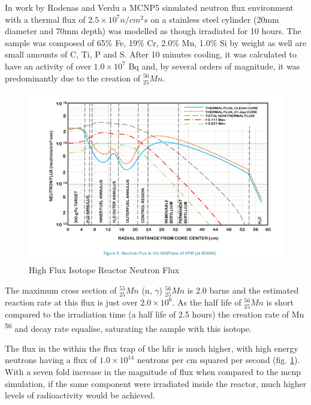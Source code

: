 In work by Rodenas and Verdu a MCNP5 simulated neutron flux environment with a thermal flux of $2.5 \times 10^7 n/cm^2 s$ on a stainless steel cylinder (20mm diameter and 70mm depth) was modelled as though irradiated for 10 hours\cite{radionuclides}.  The sample was composed of 65\% Fe, 19\% Cr, 2.0\% Mn, 1.0\% Si by weight as well are small amounts of C, Ti, P and S.  After 10 minutes cooling, it was calculated to have an activity of over $1.0 \times 10^7$ Bq and, by several orders of magnitude, it was predominantly due to the creation of ${}^{56}_{25}Mn$.  

\begin{figure}
  \begin{center}
    \includegraphics[width=0.75\linewidth]{chapters/consequences_of_ionizing_radiation/images/HFIR_neutron_spectra_guide.png}
    \caption{High Flux Isotope Reactor Neutron Flux}
    \label{fig:hfir_neutron_flux}
  \end{center}
\end{figure}

The maximum cross section of ${}^{55}_{25}Mn$ (n, $\gamma$) ${}^{56}_{25}Mn$ is 2.0 barns and the estimated reaction rate at this flux is just over $2.0 \times 10^6$.  As the half life of ${}^{56}_{25}Mn$ is short compared to the irradiation time (a half life of 2.5 hours) the creation rate of Mn \textsuperscript{56} and decay rate equalise, saturating the sample with this isotope.

The flux in the within the flux trap of the \acrshort{hfir} is much higher, with high energy neutrons having a flux of $1.0 \times 10^{14}$ neutrons per cm squared per second (fig. \ref{fig:hfir_neutron_flux}).  With a seven fold increase in the magnitude of flux when compared to the \acrshort{mcnp} simulation, if the same component were irradiated inside the reactor, much higher levels of radioactivity would be achieved.  


